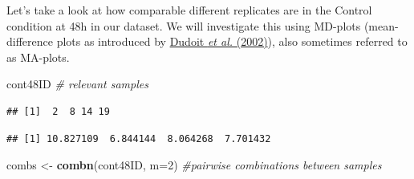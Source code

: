 \documentclass[ignorenonframetext,]{beamer}
\newenvironment{Shaded}{\begin{snugshade}}{\end{snugshade}}
\newcommand{\CommentTok}[1]{\textcolor[rgb]{0.56,0.35,0.01}{\textit{#1}}}
\newcommand{\DataTypeTok}[1]{\textcolor[rgb]{0.13,0.29,0.53}{#1}}
\newcommand{\DecValTok}[1]{\textcolor[rgb]{0.00,0.00,0.81}{#1}}
\newcommand{\FloatTok}[1]{\textcolor[rgb]{0.00,0.00,0.81}{#1}}
\newcommand{\KeywordTok}[1]{\textcolor[rgb]{0.13,0.29,0.53}{\textbf{#1}}}
\newcommand{\NormalTok}[1]{#1}
\newcommand{\OperatorTok}[1]{\textcolor[rgb]{0.81,0.36,0.00}{\textbf{#1}}}
\newcommand{\StringTok}[1]{\textcolor[rgb]{0.31,0.60,0.02}{#1}}
\begin{document}
\begin{frame}[fragile]

Let's take a look at how comparable different replicates are in the
Control condition at 48h in our dataset. We will investigate this using
MD-plots (mean-difference plots as introduced by
\href{https://www.jstor.org/stable/24307038}{Dudoit \emph{et al.}
(2002)}), also sometimes referred to as MA-plots.

\begin{Shaded}
\begin{Highlighting}[]
\NormalTok{cont48ID }\CommentTok{# relevant samples}
\end{Highlighting}
\end{Shaded}

\begin{verbatim}
## [1]  2  8 14 19
\end{verbatim}

\begin{Shaded}
\end{Shaded}

\begin{verbatim}
## [1] 10.827109  6.844144  8.064268  7.701432
\end{verbatim}

\begin{Shaded}
\begin{Highlighting}[]
\NormalTok{combs <-}\StringTok{ }\KeywordTok{combn}\NormalTok{(cont48ID, }\DataTypeTok{m=}\DecValTok{2}\NormalTok{) }\CommentTok{#pairwise combinations between samples}


\end{Highlighting}
\end{Shaded}
\end{frame}
\end{document}
